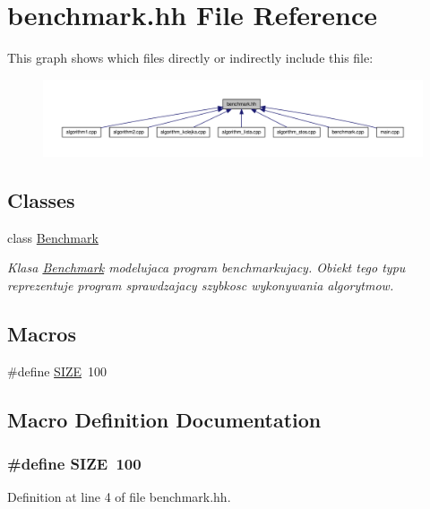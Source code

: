 \hypertarget{benchmark_8hh}{\section{benchmark.\-hh File Reference}
\label{benchmark_8hh}
}
This graph shows which files directly or indirectly include this file\-:\nopagebreak
\begin{figure}[H]
\begin{center}
\leavevmode
\includegraphics[width=350pt]{benchmark_8hh__dep__incl}
\end{center}
\end{figure}
\subsection*{Classes}
\begin{DoxyCompactItemize}
\item 
class \hyperlink{class_benchmark}{Benchmark}
\begin{DoxyCompactList}\small\item\em Klasa \hyperlink{class_benchmark}{Benchmark} modelujaca program benchmarkujacy. Obiekt tego typu reprezentuje program sprawdzajacy szybkosc wykonywania algorytmow. \end{DoxyCompactList}\end{DoxyCompactItemize}
\subsection*{Macros}
\begin{DoxyCompactItemize}
\item 
\#define \hyperlink{benchmark_8hh_a70ed59adcb4159ac551058053e649640}{S\-I\-Z\-E}~100
\end{DoxyCompactItemize}


\subsection{Macro Definition Documentation}
\hypertarget{benchmark_8hh_a70ed59adcb4159ac551058053e649640}{
\subsubsection[{S\-I\-Z\-E}]{\setlength{\rightskip}{0pt plus 5cm}\#define S\-I\-Z\-E~100}}\label{benchmark_8hh_a70ed59adcb4159ac551058053e649640}


Definition at line 4 of file benchmark.\-hh.

